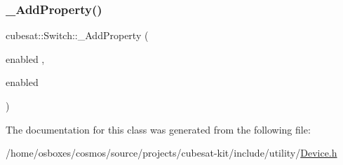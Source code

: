 \mbox{\label{classcubesat_1_1Switch_a8faf933b298ba873587115e42b6d7772}} 
\subsubsection{\texorpdfstring{\+\_\+\+Add\+Property()}{\_AddProperty()}\hspace{0.1cm}{\footnotesize\ttfamily [6/6]}}
{\footnotesize\ttfamily cubesat\+::\+Switch\+::\+\_\+\+Add\+Property (\begin{DoxyParamCaption}\item[{enabled}]{,  }\item[{enabled}]{ }\end{DoxyParamCaption})}



The documentation for this class was generated from the following file\+:\begin{DoxyCompactItemize}
\item 
/home/osboxes/cosmos/source/projects/cubesat-\/kit/include/utility/\hyperlink{Device_8h}{Device.\+h}\end{DoxyCompactItemize}
